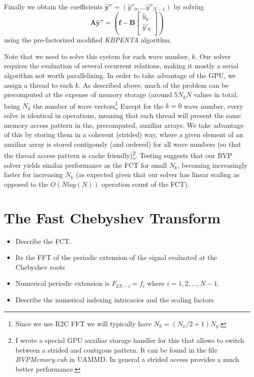 \documentclass[ twoside,openright,titlepage,numbers=noenddot,%
headinclude,footinclude,cleardoublepage=empty,abstract=on,
BCOR=5mm,paper=a4,fontsize=11pt, dvipsnames
]{scrreprt}
\newcommand{\uammd}{\gls{UAMMD}\xspace}
\newcommand{\gpu}{\gls{GPU}\xspace}
\newcommand{\fou}[1]{\widehat{#1}}
\begin{document}
Finally we obtain the coefficients $\fou{\bm{y}}''=(\fou{y}''_0, \dots \fou{y}''_{N-1})$ by solving
\begin{equation}
\bm{A}\fou{\bm{y}}''=\left(\bm{f}-\bm{B}\begin{bmatrix}   \fou{y}_0 \\ \fou{y}'_0\\ \end{bmatrix}\right)
\end{equation}
using the pre-factorized modified \emph{KBPENTA} algorithm.

Note that we need to solve this system for each wave number, $k$. Our solver requires the evaluation of several recurrent relations, making it mostly a serial algorithm not worth parallelizing. In order to take advantage of the \gpu, we assign a thread to each $k$. As described above, much of the problem can be precomputed at the expense of memory storage (around $5N_kN$ values in total, being $N_k$ the number of wave vectors\footnote{Since we use R2C \gls{FFT} we will typically have $N_k=(N_x/2+1)N_y$.}
Except for the $k=0$ wave number, every solve is identical in operations, meaning that each thread will present the same memory access pattern in the, precomputed, auxiliar arrays. We take advantage of this by storing them in a coherent (strided) way, where a given element of an auxiliar array is stored contigously (and ordered) for all wave numbers (so that the thread access pattern is cache friendly)\footnote{I wrote a special \gpu auxiliar storage handler for this that allows to switch between a strided and contigous pattern. It can be found in the file \emph{BVPMemory.cuh} in \uammd. In general a strided access provides a much better performance.}. Testing suggests that our \gls{BVP} solver yields similar performance as the \gls{FCT} for small $N_k$, becoming increasingly faster for increasing $N_k$ (as expected given that our solver has linear scaling as opposed to the $O(Nlog(N))$ operation count of the \gls{FCT}).

\chapter{The Fast Chebyshev Transform}\label{sec:fct}

\begin{itemize}
\item Describe the FCT.
\item Its the FFT of the periodic extension of the signal evaluated at the Chebyshev roots
\item Numerical periodic extension is $F_{2N-i} = f_i$ where $i=1,2,...,N-1$.
\item Describe the numerical indexing intricacies and the scaling factors
\end{itemize}
\end{document}
